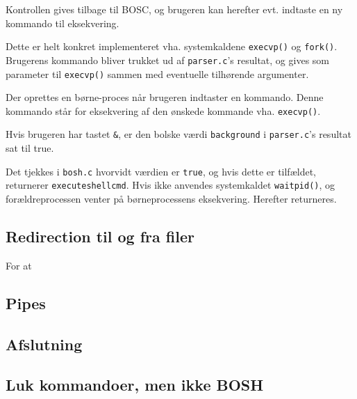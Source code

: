 Kontrollen gives tilbage til BOSC, og brugeren kan herefter evt. indtaste en ny kommando til eksekvering. 

Dette er helt konkret implementeret vha. systemkaldene \verb+execvp()+ og \verb+fork()+. Brugerens kommando bliver trukket ud af \verb+parser.c+'s resultat, og gives som parameter til \verb+execvp()+ sammen med eventuelle tilhørende argumenter. 

Der oprettes en børne-proces når brugeren indtaster en kommando. Denne kommando står for eksekvering af den ønskede kommande vha. \verb+execvp()+. 

Hvis brugeren har tastet \verb+&+, er den bolske værdi \verb+background+ i \verb+parser.c+'s resultat sat til true. 

Det tjekkes i \verb+bosh.c+ hvorvidt værdien er \verb+true+, og hvis dette er tilfældet, returnerer \verb+executeshellcmd+. Hvis ikke anvendes systemkaldet \verb+waitpid()+, og forældreprocessen venter på børneprocessens eksekvering. Herefter returneres.
\subsection{Redirection til og fra filer}
For at 
\subsection{Pipes}
\subsection{Afslutning}
\subsection{Luk kommandoer, men ikke BOSH}